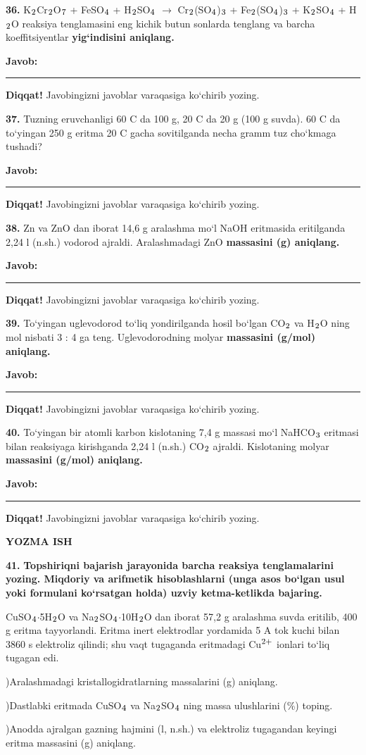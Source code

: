 \documentclass[11pt,a4paper]{article}
\renewcommand{\textsubscript}[1]{\ensuremath{_{\text{\fontsize{8}{8}\selectfont #1}}}}
\renewcommand{\textsuperscript}[1]{\ensuremath{^{\text{\fontsize{8}{8}\selectfont #1}}}}
\newcommand{\javob}{\par\smallskip\noindent\textbf{Javob:} \rule[-2pt]{7.5cm}{0.4pt}\par\smallskip\noindent\textbf{Diqqat!} Javobingizni javoblar varaqasiga ko`chirib yozing.\par\medskip}
\begin{document}
\par\bigskip
\noindent\textbf{36.} K\textsubscript{2}Cr\textsubscript{2}O\textsubscript{7} + FeSO\textsubscript{4} + H\textsubscript{2}SO\textsubscript{4} $\to$ Cr\textsubscript{2}(SO\textsubscript{4})\textsubscript{3} + Fe\textsubscript{2}(SO\textsubscript{4})\textsubscript{3} + K\textsubscript{2}SO\textsubscript{4} + H\textsubscript{2}O reaksiya tenglamasini eng kichik butun sonlarda tenglang va barcha koeffitsiyentlar \textbf{yig`indisini aniqlang.}
\javob
\noindent\textbf{37.} Tuzning eruvchanligi 60 \textdegree{}C da 100 g, 20 \textdegree{}C da 20 g (100 g suvda). 60 \textdegree{}C da to`yingan 250 g eritma 20 \textdegree{}C gacha sovitilganda necha gramm tuz cho`kmaga tushadi?
\javob
\noindent\textbf{38.} Zn va ZnO dan iborat 14,6 g aralashma mo`l NaOH eritmasida eritilganda 2,24 l (n.sh.) vodorod ajraldi. Aralashmadagi ZnO \textbf{massasini (g) aniqlang.}
\javob
\noindent\textbf{39.} To`yingan uglevodorod to`liq yondirilganda hosil bo`lgan CO\textsubscript{2} va H\textsubscript{2}O ning mol nisbati 3 : 4 ga teng. Uglevodorodning molyar \textbf{massasini (g/mol) aniqlang.}
\javob
\noindent\textbf{40.} To`yingan bir atomli karbon kislotaning 7,4 g massasi mo`l NaHCO\textsubscript{3} eritmasi bilan reaksiyaga kirishganda 2,24 l (n.sh.) CO\textsubscript{2} ajraldi. Kislotaning molyar \textbf{massasini (g/mol) aniqlang.}
\javob
\par\bigskip\begin{center}\textbf{\fontsize{13}{15}\selectfont YOZMA ISH}\end{center}
\noindent\textbf{41.} \textbf{Topshiriqni bajarish jarayonida barcha reaksiya tenglamalarini yozing. Miqdoriy va arifmetik hisoblashlarni (unga asos bo`lgan usul yoki formulani ko`rsatgan holda) uzviy ketma-ketlikda bajaring.}\par\smallskip
CuSO\textsubscript{4}$\cdot$5H\textsubscript{2}O va Na\textsubscript{2}SO\textsubscript{4}$\cdot$10H\textsubscript{2}O dan iborat 57,2 g aralashma suvda eritilib, 400 g eritma tayyorlandi. Eritma inert elektrodlar yordamida 5 A tok kuchi bilan 3860 s elektroliz qilindi; shu vaqt tugaganda eritmadagi Cu\textsuperscript{2+} ionlari to`liq tugagan edi.\par
{})Aralashmadagi kristallogidratlarning massalarini (g) aniqlang.\par
{})Dastlabki eritmada CuSO\textsubscript{4} va Na\textsubscript{2}SO\textsubscript{4} ning massa ulushlarini (\%) toping.\par
{})Anodda ajralgan gazning hajmini (l, n.sh.) va elektroliz tugagandan keyingi eritma massasini (g) aniqlang.\par
\end{document}
